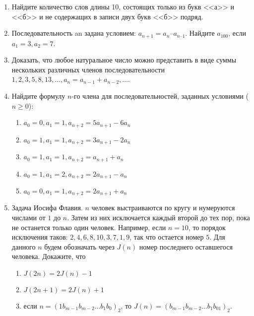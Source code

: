 \begin{enumerate}
\item Найдите количество слов длины 10, состоящих только из букв <<а>> и <<б>> и не содержащих в записи двух букв <<б>> подряд. 

\item Последовательность an задана условием: $a_{n+1} = a_n – a_{n–1}$.
      Найдите $a_{100}$, если $a_1 = 3,  a_2 = 7$.

\item Доказать, что любое натуральное число можно представить в виде суммы нескольких различных членов последовательности $1, 2, 3, 5, 8, 13, \ldots, a_n = a_{n - 1} + a_{n - 2}, \ldots$. 

\item Найдите формулу $n$-го члена для последовательностей, заданных условиями ($n \ge 0$): 
  \begin{enumerate}
    \item $a_0 = 0, a_1 = 1, a_{n + 2} = 5a_{n + 1} - 6a_n$
    \item $a_0 = 1, a_1 = 1, a_{n + 2} = 3a_{n + 1} - 2a_n$
    \item $a_0 = 1, a_1 = 1, a_{n + 2} = a_{n + 1} + a_n$
    \item $a_0 = 1, a_1 = 2, a_{n + 2} = 2a_{n + 1} - a_n$
    \item $a_0 = 0, a_1 = 1, a_{n + 2} = 2a_{n + 1} + a_n$
  \end{enumerate}

\item Задача Иосифа Флавия. $n$ человек выстраиваются по кругу и нумеруются числами от $1$ до $n$. Затем из них исключается каждый второй до тех пор, пока не останется только один человек. Например, если $n = 10$, то порядок исключения таков: $2, 4, 6, 8, 10, 3, 7, 1, 9$, так что остается номер $5$. Для данного $n$ будем обозначать через $J(n)$ номер последнего оставшегося человека. Докажите, что 
  \begin{enumerate}
    \item $J(2n) = 2J(n) - 1$
    \item $J(2n + 1) = 2J(n) + 1$
    \item если $n = (1b_{m - 1}b_{m - 2}\ldots b_1b_0)_2$, то $J(n) = (b_{m - 1}b_{m - 2}\ldots b_1b_01)_2$. 

  \end{enumerate}


\end{enumerate}
